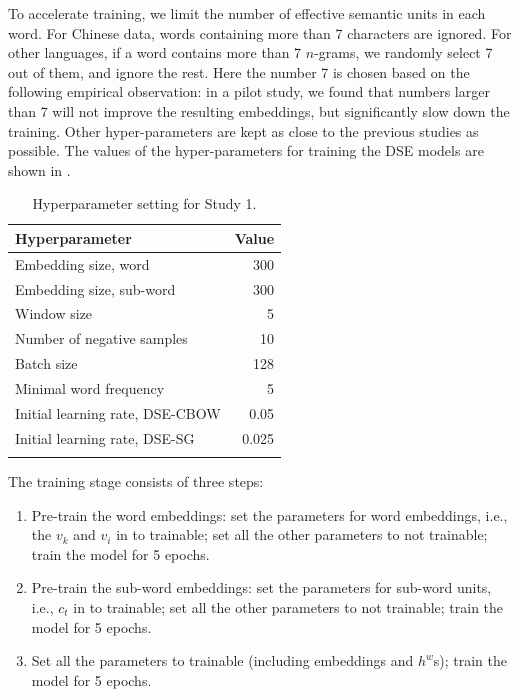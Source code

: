 \documentclass[output=paper]{langsci/langscibook}
\begin{document}
To accelerate training, we limit the number of effective semantic units in each word. For Chinese data, words containing more than 7 characters are ignored. For other languages, if a word contains more than 7 $n$-grams, we randomly select 7 out of them, and ignore the rest. Here the number 7 is chosen based on the following empirical observation: in a pilot study, we found that  numbers larger than 7 will not improve the resulting embeddings, but significantly slow down the training.  
Other hyper-parameters are kept as close to the previous studies as possible.  
The values of the hyper-parameters for training the DSE models are shown in .

\begin{table}
\begin{tabular}{l r}
\lsptoprule
Hyperparameter & Value \\
\midrule
Embedding size, word & 300 \\
Embedding size, sub-word & 300 \\
Window size & 5 \\ 
Number of negative samples & 10 \\
Batch size & 128\\
Minimal word frequency & 5 \\
Initial learning rate, DSE-CBOW & 0.05\\
Initial learning rate, DSE-SG & 0.025\\
\lspbottomrule
\end{tabular}
\caption{Hyperparameter setting for Study 1.}\label{tab:hyperprams}
\end{table}


The training stage consists of three steps: 

\begin{enumerate}
	\item Pre-train the word embeddings: set the parameters for word embeddings, i.e., the $v_k$ and $v_i$ in  to trainable; set all the other parameters to not trainable; train the model for 5 epochs.
	\item Pre-train the sub-word embeddings: set the parameters for sub-word units, i.e., $c_t$ in  to trainable; set all the other parameters to not trainable; train the model for 5 epochs.
	\item Set all the parameters to trainable (including embeddings and $h^w$s); train the model for 5 epochs. 
\end{enumerate}
\end{document}
